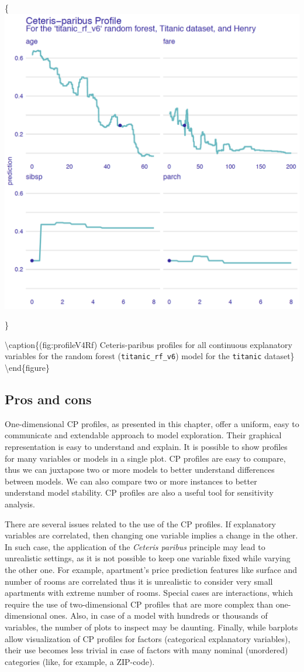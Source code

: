\documentclass[12pt,]{krantz}
\begin{document}
\{\centering \includegraphics[width=0.7\linewidth]{figure/profile_v4_rf3}

\}

\textbackslash{}caption\{(fig:profileV4Rf) Ceteris-paribus profiles for all continuous explanatory variables for the random forest (\texttt{titanic\_rf\_v6}) model for the \texttt{titanic} dataset\}\label{fig:profileV4Rf}
\textbackslash{}end\{figure\}

\hypertarget{CPProsCons}{%
\subsection{Pros and cons}\label{CPProsCons}}

One-dimensional CP profiles, as presented in this chapter, offer a uniform, easy to communicate and extendable approach to model exploration. Their graphical representation is easy to understand and explain. It is possible to show profiles for many variables or models in a single plot. CP profiles are easy to compare, thus we can juxtapose two or more models to better understand differences between models. We can also compare two or more instances to better understand model stability. CP profiles are also a useful tool for sensitivity analysis.

There are several issues related to the use of the CP profiles. If explanatory variables are correlated, then changing one variable implies a change in the other. In such case, the application of the \emph{Ceteris paribus} principle may lead to unrealistic settings, as it is not possible to keep one variable fixed while varying the other one. For example, apartment's price prediction features like surface and number of rooms are correlated thus it is unrealistic to consider very small apartments with extreme number of rooms. Special cases are interactions, which require the use of two-dimensional CP profiles that are more complex than one-dimensional ones. Also, in case of a model with hundreds or thousands of variables, the number of plots to inspect may be daunting. Finally, while barplots allow visualization of CP profiles for factors (categorical explanatory variables), their use becomes less trivial in case of factors with many nominal (unordered) categories (like, for example, a ZIP-code).
\end{document}
